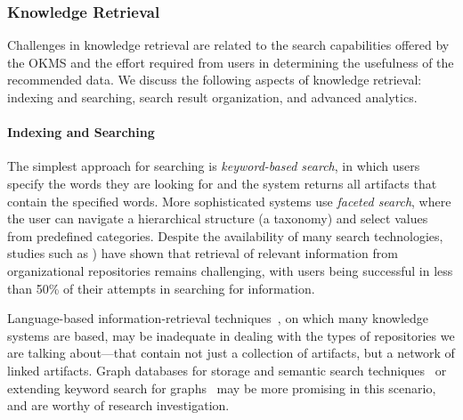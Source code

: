 \vspace{-5pt}
\subsubsection{Knowledge Retrieval}

Challenges in knowledge retrieval are related to the search capabilities offered
by the OKMS and the effort required from users in determining the usefulness of
the recommended data. We discuss the following aspects of knowledge retrieval:
indexing and searching, search result organization, and advanced analytics.

\vskip -5pt
\paragraph*{Indexing and Searching} The simplest approach for searching
is \textit{keyword-based search}, in which users specify the words they are
looking for and the system returns all artifacts that contain the specified
words. More sophisticated systems use \textit{faceted search}, where the user
can navigate a hierarchical structure (\eg a taxonomy) and select values from
predefined categories.  Despite the availability of many search technologies,
studies such as \cite{idc2}) have shown that retrieval of relevant information
from organizational repositories remains challenging, with users being
successful in less than 50\% of their attempts in searching for information.

Language-based information-retrieval techniques~\cite{manning2008introduction},
on which many knowledge systems are based, may be inadequate in dealing with the
types of repositories we are talking about---that contain not just a collection
of artifacts, but a network of linked artifacts.  Graph databases for storage
and semantic search techniques~\cite{Guha:2003} or extending keyword search for
graphs~\cite{kacholia2005bidirectional} may be more promising in this scenario,
and are worthy of research investigation.


